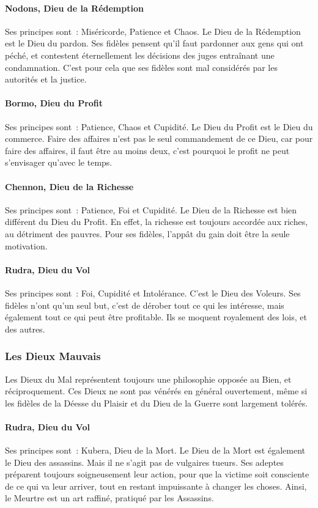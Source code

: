 \documentclass[a4paper,10pt,openany]{book}
\begin{document}
\begin{multicols}{2}
\paragraph{Nodons, Dieu de la Rédemption}
Ses principes sont : Miséricorde, Patience et Chaos. Le Dieu de la Rédemption est le Dieu du pardon. Ses fidèles pensent qu’il faut pardonner aux gens
qui ont péché, et contestent éternellement les décisions des juges entraînant une condamnation. C’est pour cela que ses fidèles sont mal considérés
par les autorités et la justice.
\paragraph{Bormo, Dieu du Profit}
Ses principes sont : Patience, Chaos et Cupidité. Le Dieu du Profit est le Dieu du commerce. Faire des affaires n’est pas le seul commandement de ce
Dieu, car pour faire des affaires, il faut être au moins deux, c’est pourquoi le profit ne peut s’envisager qu’avec le temps.
\paragraph{Chennon, Dieu de la Richesse}
Ses principes sont : Patience, Foi et Cupidité. Le Dieu de la Richesse est bien différent du Dieu du Profit. En effet, la richesse est toujours
accordée aux riches, au détriment des pauvres. Pour ses fidèles, l’appât du gain doit être la seule motivation.
\paragraph{Rudra, Dieu du Vol}
Ses principes sont : Foi, Cupidité et Intolérance. C’est le Dieu des Voleurs. Ses fidèles n’ont qu’un seul but, c’est de dérober tout ce qui les
intéresse, mais également tout ce qui peut être profitable. Ils se moquent royalement des lois, et des autres.

\subsubsection{Les Dieux Mauvais}
Les Dieux du Mal représentent toujours une philosophie opposée au Bien, et réciproquement. Ces Dieux ne sont pas vénérés en général ouvertement, même
si les fidèles de la Déesse du Plaisir et du Dieu de la Guerre sont largement tolérés.
\paragraph{Rudra, Dieu du Vol}
Ses principes sont : Kubera, Dieu de la Mort. Le Dieu de la Mort est également le Dieu des assassins. Mais il ne s’agit pas de vulgaires tueurs. Ses
adeptes préparent toujours soigneusement leur action, pour que la victime soit consciente de ce qui va leur arriver, tout en restant impuissante à
changer les choses. Ainsi, le Meurtre est un art raffiné, pratiqué par les Assassins.

\end{multicols}
\end{document}
